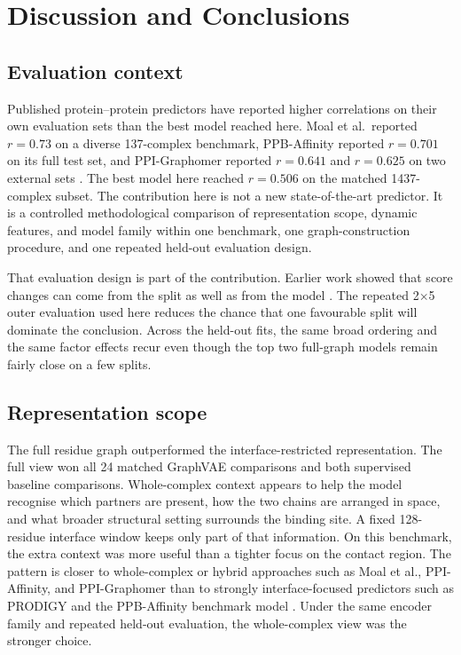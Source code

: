 \chapter{Discussion and Conclusions}
\label{ch:discussion}

\section{Evaluation context}

Published protein--protein predictors have reported higher correlations on their own evaluation sets than the best model reached here. Moal et al.\ reported $r=0.73$ on a diverse 137-complex benchmark, PPB-Affinity reported $r=0.701$ on its full test set, and PPI-Graphomer reported $r=0.641$ and $r=0.625$ on two external sets \citep{Moal2011AffinityPrediction,Liu2024PPBAffinity,Xie2025PPIGraphomer}. The best model here reached $r=0.506$ on the matched 1437-complex subset. The contribution here is not a new state-of-the-art predictor. It is a controlled methodological comparison of representation scope, dynamic features, and model family within one benchmark, one graph-construction procedure, and one repeated held-out evaluation design.

That evaluation design is part of the contribution. Earlier work showed that score changes can come from the split as well as from the model \citep{Moal2011AffinityPrediction,RomeroMolina2022PPIAffinity,Graber2025DataBias}. The repeated 2$\times$5 outer evaluation used here reduces the chance that one favourable split will dominate the conclusion. Across the held-out fits, the same broad ordering and the same factor effects recur even though the top two full-graph models remain fairly close on a few splits.

\section{Representation scope}

The full residue graph outperformed the interface-restricted representation. The full view won all 24 matched GraphVAE comparisons and both supervised baseline comparisons. Whole-complex context appears to help the model recognise which partners are present, how the two chains are arranged in space, and what broader structural setting surrounds the binding site. A fixed 128-residue interface window keeps only part of that information. On this benchmark, the extra context was more useful than a tighter focus on the contact region. The pattern is closer to whole-complex or hybrid approaches such as Moal et al., PPI-Affinity, and PPI-Graphomer than to strongly interface-focused predictors such as PRODIGY and the PPB-Affinity benchmark model \citep{Vangone2015Contacts,Moal2011AffinityPrediction,Liu2024PPBAffinity,RomeroMolina2022PPIAffinity,Xie2025PPIGraphomer}. Under the same encoder family and repeated held-out evaluation, the whole-complex view was the stronger choice.

